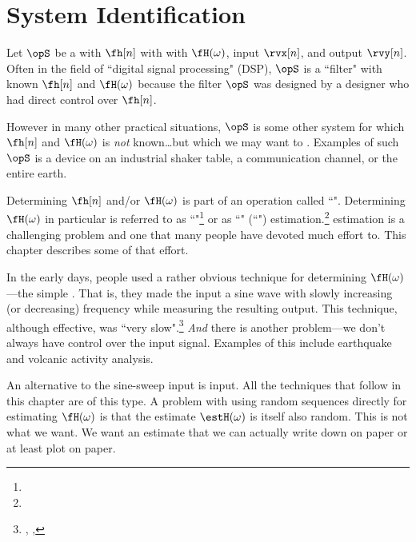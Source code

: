 \chapter{System Identification}

Let $\opS$ be a  with  $\fh[n]$ with
with  $\fH(\omega)$,
input $\rvx[n]$, and output $\rvy[n]$. 
Often in the field of ``digital signal processing" (DSP), $\opS$ is a ``filter" 
with known $\fh[n]$ and $\fH(\omega)$ because the filter $\opS$ was 
designed by a designer who had direct control over $\fh[n]$.

However in many other practical situations, $\opS$ is some other system 
for which $\fh[n]$ and $\fH(\omega)$ is \emph{not} known\ldots but which we may
want to . Examples of such $\opS$ is a 
device on an industrial shaker table, a communication channel, or the entire earth.

Determining $\fh[n]$ and/or $\fH(\omega)$ is part of an operation called ``".
Determining $\fH(\omega)$ in particular is referred to as
``"\footnote{}
or as 
``" (``") estimation.\footnote{}
 estimation is a challenging problem and one that
many people have devoted much effort to. 
This chapter describes some of that effort.

In the early days, people used a rather obvious technique for determining $\fH(\omega)$---the simple
. That is, they made the input a sine wave with slowly increasing (or decreasing) 
frequency while measuring the resulting output.
This technique, although effective, was ``very slow".\footnote{
  ,
  ,
  }
\emph{And} there is another problem---we don't always have control over the input signal.
Examples of this include earthquake and volcanic activity analysis.

An alternative to the sine-sweep input is  input. 
All the techniques that follow in this chapter are of this type.
A problem with using random sequences directly for estimating $\fH(\omega)$ is that the 
estimate $\estH(\omega)$ is itself also random.
This is not what we want. We want an estimate that we can actually write down 
on paper or at least plot on paper.

